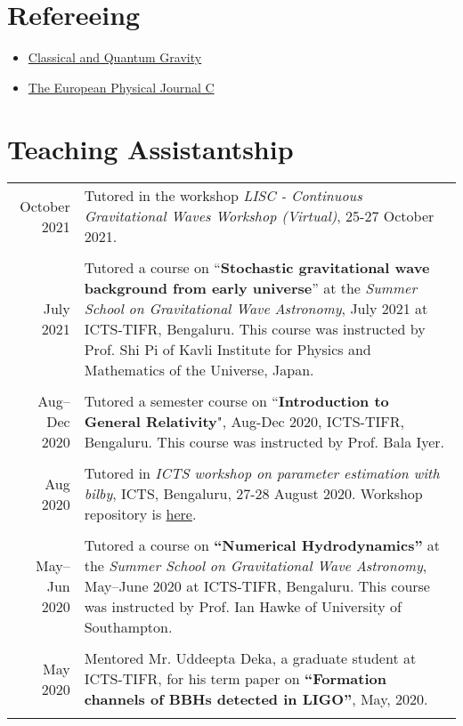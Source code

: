 \documentclass[10pt]{article}
\begin{document}
\section*{Refereeing}
\begin{itemize}
\item \href{https://iopscience.iop.org/journal/0264-9381}{Classical and Quantum Gravity}
\item \href{https://epjc.epj.org/}{The European Physical Journal C}
\end{itemize}


\section*{Teaching Assistantship}
\begin{longtable}{rp{14cm}}
  October 2021 & Tutored in the workshop {\itshape LISC - Continuous Gravitational Waves Workshop (Virtual)}, 25-27 October 2021.\\\\
  July 2021 & {Tutored} a course on ``{\bfseries Stochastic gravitational wave background from early universe}'' at the {\itshape Summer School on Gravitational Wave Astronomy}, July 2021 at ICTS-TIFR, Bengaluru. This course was instructed by Prof. Shi Pi of Kavli Institute for Physics and Mathematics of the Universe, Japan.\\\\
  Aug--Dec 2020 & {Tutored} a semester course on ``{\bfseries Introduction to General Relativity}", Aug-Dec 2020, ICTS-TIFR, Bengaluru. This course was instructed by Prof. Bala Iyer.\\\\
  
  Aug 2020 & {Tutored} in {\itshape ICTS workshop on parameter estimation with bilby}, ICTS, Bengaluru, 27-28 August 2020. Workshop repository is \href{https://github.com/GregoryAshton/GWParameterEstimationWorkshop2020}{here}.\\\\
  
  May--Jun 2020 & {Tutored} a course on {\bfseries ``Numerical Hydrodynamics''} at the {\itshape Summer School on Gravitational Wave Astronomy}, May--June 2020 at ICTS-TIFR, Bengaluru. This course was instructed by Prof. Ian Hawke of University of Southampton.\\\\
  
  May 2020 & {Mentored} Mr. Uddeepta Deka, a graduate student at ICTS-TIFR, for his term paper on {\bfseries ``Formation channels of BBHs detected in LIGO''}, May, 2020.\\\\
  

\end{longtable}
\end{document}
